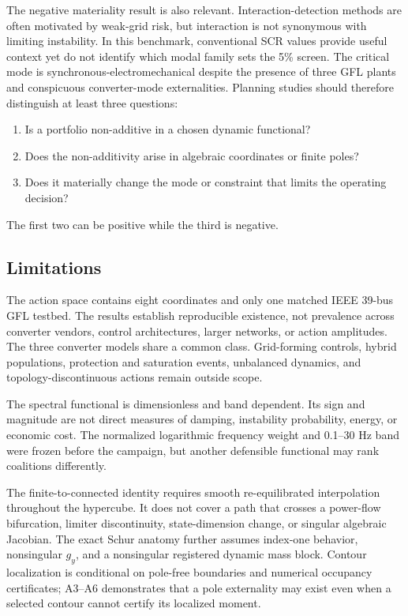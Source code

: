The negative materiality result is also relevant. Interaction-detection
methods are often motivated by weak-grid risk, but interaction is not
synonymous with limiting instability. In this benchmark, conventional SCR
values provide useful context yet do not identify which modal family sets the
5\% screen. The critical mode is synchronous-electromechanical despite the
presence of three GFL plants and conspicuous converter-mode externalities.
Planning studies should therefore distinguish at least three questions:
\begin{enumerate}
    \item Is a portfolio non-additive in a chosen dynamic functional?
    \item Does the non-additivity arise in algebraic coordinates or finite
    poles?
    \item Does it materially change the mode or constraint that limits the
    operating decision?
\end{enumerate}
The first two can be positive while the third is negative.

\subsection{Limitations}

The action space contains eight coordinates and only one matched IEEE 39-bus
GFL testbed. The results establish reproducible existence, not prevalence
across converter vendors, control architectures, larger networks, or action
amplitudes. The three converter models share a common class. Grid-forming
controls, hybrid populations, protection and saturation events, unbalanced
dynamics, and topology-discontinuous actions remain outside scope.

The spectral functional is dimensionless and band dependent. Its sign and
magnitude are not direct measures of damping, instability probability,
energy, or economic cost. The normalized logarithmic frequency weight and
0.1--30 Hz band were frozen before the campaign, but another defensible
functional may rank coalitions differently.

The finite-to-connected identity requires smooth re-equilibrated interpolation
throughout the hypercube. It does not cover a path that crosses a power-flow
bifurcation, limiter discontinuity, state-dimension change, or singular
algebraic Jacobian. The exact Schur anatomy further assumes index-one behavior,
nonsingular $g_y$, and a nonsingular registered dynamic mass block. Contour
localization is conditional on pole-free boundaries and numerical occupancy
certificates; A3--A6 demonstrates that a pole externality may exist even when
a selected contour cannot certify its localized moment.

